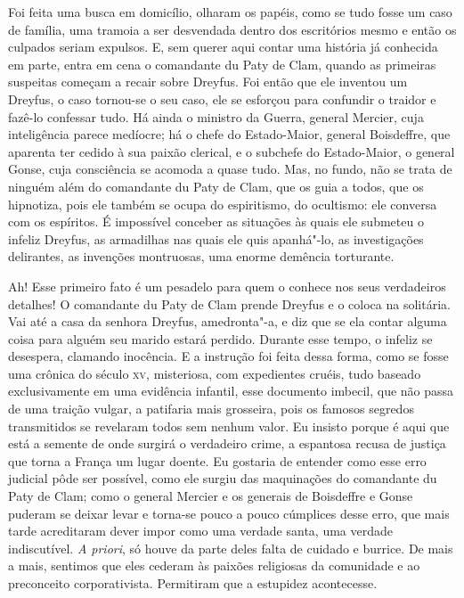  Foi feita uma busca em domicílio, olharam os papéis, como se tudo fosse
um caso de família, uma tramoia a ser desvendada dentro dos escritórios
mesmo e então os culpados seriam expulsos. E, sem querer aqui contar
uma história já conhecida em parte, entra em cena o comandante du Paty
de Clam, quando as primeiras suspeitas começam a recair sobre Dreyfus.
Foi então que ele inventou um Dreyfus, o caso tornou-se o seu caso,
ele se esforçou para confundir o traidor e fazê-lo confessar tudo. Há
ainda o ministro da Guerra, general Mercier, cuja inteligência parece
medíocre; há o chefe do Estado-Maior, general Boisdeffre, que
aparenta ter cedido à sua paixão clerical, e o subchefe do
Estado-Maior, o general Gonse, cuja consciência se acomoda a quase
tudo. Mas, no fundo, não se trata de ninguém além do comandante du Paty
de Clam, que os guia a todos, que os hipnotiza, pois ele também se
ocupa do espiritismo, do ocultismo: ele conversa com os espíritos. É
impossível conceber as situações às quais ele submeteu o infeliz
Dreyfus, as armadilhas nas quais ele quis apanhá"-lo, as
investigações delirantes, as invenções montruosas, uma enorme demência
torturante.

Ah! Esse primeiro fato é um pesadelo para quem o conhece nos seus
verdadeiros detalhes! O comandante du Paty de Clam prende Dreyfus e o
coloca na solitária. Vai até a casa da senhora Dreyfus, amedronta"-a,
e diz que se ela contar alguma coisa para alguém seu
marido estará perdido. Durante esse tempo, o infeliz se desespera,
clamando inocência. E a instrução foi feita dessa forma, como se
fosse uma crônica do século \textsc{xv}, misteriosa, com expedientes cruéis,
tudo baseado exclusivamente em uma evidência infantil, esse documento
imbecil, que não passa de uma traição vulgar, a patifaria mais
grosseira, pois os famosos segredos transmitidos se revelaram todos sem
nenhum valor. Eu insisto porque é aqui que está a semente de onde
surgirá o verdadeiro crime, a espantosa recusa de justiça que torna a
França um lugar doente. Eu gostaria de entender como esse erro judicial
pôde ser possível, como ele surgiu das maquinações do comandante du
Paty de Clam; como o general Mercier e os generais de Boisdeffre e Gonse
puderam se deixar levar e torna-se pouco a pouco cúmplices desse
erro, que mais tarde acreditaram dever impor como uma verdade santa,
uma verdade indiscutível.  \textit{A priori}, só houve da parte deles
falta de cuidado e burrice. De mais a mais, sentimos que eles cederam
às paixões religiosas da comunidade e ao preconceito corporativista.
Permitiram que a estupidez acontecesse.

